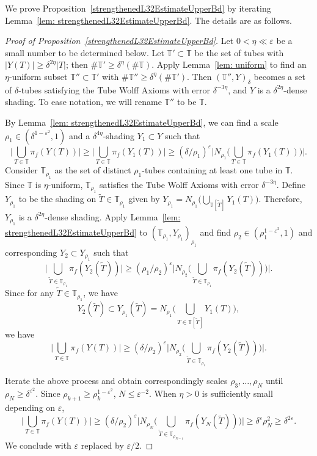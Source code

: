 \documentclass[letterpaper, reqno,11pt]{article}
\numberwithin{equation}{section}
\newcommand{\eps}{\varepsilon}
\newcommand{\tubes}{\mathbb{T}}
\numberwithin{thm}{section}
\theoremstyle{remark}
\begin{document}
We prove Proposition~\ref{strengthenedL32EstimateUpperBd} by iterating Lemma~\ref{lem: strengthenedL32EstimateUpperBd}. The details are as follows. 
\begin{proof}[Proof of Proposition~\ref{strengthenedL32EstimateUpperBd}]
Let $0<\eta\ll \eps$ be a small number to be determined below. Let $\mathbb{T}'\subset \mathbb{T}$ be the set of tubes with $|Y(T)|\geq \delta^{2\eta}|T|$; then $\#\mathbb{T}'\geq \delta^{\eta} (\#\mathbb{T}).$ Apply Lemma~\ref{lem: uniform} to find  an $\eta$-uniform subset  $\mathbb{T}''\subset \mathbb{T}'$ with $\#\mathbb{T}''\geq \delta^{\eta} (\#\mathbb{T}')$.  Then $(\mathbb{T}'', Y)_{\delta}$ becomes a set of $\delta$-tubes satisfying the Tube Wolff Axioms with error $\delta^{-3\eta}$, and $Y$ is a $\delta^{2\eta}$-dense shading.  To ease notation, we will rename $\tubes''$ to be $\tubes$.

    By Lemma~\ref{lem: strengthenedL32EstimateUpperBd}, we can find a scale $\rho_1\in (\delta^{1-\eps^2}, 1)$ and a $\delta^{4\eta}$-shading $Y_1\subset Y$ such that
    \begin{equation}\label{projectionVsScaleRho1}
\Big| \bigcup_{T\in\tubes}\pi_f (Y(T))\Big| \geq \Big| \bigcup_{T\in\tubes}\pi_f (Y_1(T))\Big| \geq (\delta/\rho_1)^{\eps} \Big| N_{\rho_1}\big( \bigcup_{T\in\tubes}\pi_f (Y_1(T)) \big)\Big|.
\end{equation}
Consider $\mathbb{T}_{\rho_1}$ as the set of distinct $\rho_1$-tubes containing at least one tube in $\mathbb{T}$. Since $\mathbb{T}$ is $\eta$-uniform, $\mathbb{T}_{\rho_1}$ satisfies the Tube Wolff Axioms with error $\delta^{-3\eta}$. Define $Y_{\rho_1}$ to be the shading on $\tilde{T}\in \mathbb{T}_{\rho_1}$ given by $Y_{\rho_1} = N_{\rho_1}\big(\bigcup_{\mathbb{T}[\tilde{T}]} Y_1(T)\big)$. Therefore, $Y_{\rho_1}$ is a $\delta^{2\eta}$-dense shading. Apply Lemma~\ref{lem: strengthenedL32EstimateUpperBd} to $(\mathbb{T}_{\rho_1}, Y_{\rho_1})_{\rho_1}$ and find $\rho_2\in (\rho_1^{1-\eps^2}, 1)$ and corresponding $Y_2\subset Y_{\rho_1}$ such that 
    \[
\Big| \bigcup_{\tilde{T}\in\mathbb{T}_{\rho_1}}\pi_f (Y_2(\tilde{T}))\Big| \geq (\rho_1/\rho_2)^{\eps} \Big| N_{\rho_2}\big( \bigcup_{\tilde{T}\in\mathbb{T}_{\rho_1}}\pi_f (Y_2(\tilde{T})) \big)\Big|.
\]
Since for any $\tilde{T}\in \mathbb{T}_{\rho_1}$,  we have
\[
Y_2(\tilde T)\subset Y_{\rho_1}(\tilde T) =N_{\rho_1}\Big(\bigcup_{T\in\mathbb{T}[\tilde{T}]} Y_1(T)\Big),
\]
we have 
\[
\Big| \bigcup_{T\in\tubes}\pi_f (Y(T))\Big| \geq (\delta/\rho_2)^{\eps}\Big| N_{\rho_2}\big( \bigcup_{\tilde{T}\in\mathbb{T}_{\rho_1}}\pi_f (Y_2(\tilde{T})) \big)\Big|. 
\]

Iterate the above process and obtain correspondingly scales $\rho_3, \dots, \rho_N$ until $\rho_N \geq \delta^{\eps^2}$. Since $\rho_{k+1} \geq \rho_k^{1-\eps^2}$, $N\leq \eps^{-2}$. When $\eta>0$ is sufficiently small depending on $\eps$, 
\[
\Big| \bigcup_{T\in\tubes}\pi_f (Y(T))\Big| \geq (\delta/\rho_2)^{\eps}\Big| N_{\rho_N}\big( \bigcup_{\tilde{T}\in\mathbb{T}_{\rho_{N-1}}}\pi_f (Y_N(\tilde{T})) \big)\Big| \geq \delta^{\eps} \rho_N^{2} \geq \delta^{2\eps}. 
\]
We conclude with $\eps$ replaced by $\eps/2$. 
\end{proof}
\end{document}
